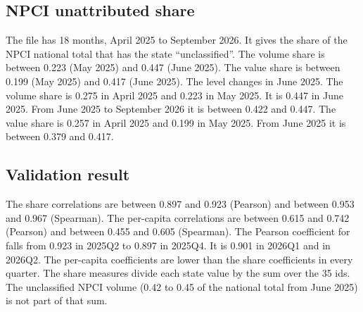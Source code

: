 \documentclass[11pt,a4paper]{article}
\begin{document}
\subsection{NPCI unattributed share}\label{sec:unattr}
The file  has 18 months, April 2025 to September 2026. It gives the share of the NPCI national total that has the state ``unclassified''.
The volume share is between 0.223 (May 2025) and 0.447 (June 2025). The value share is between 0.199 (May 2025) and 0.417 (June 2025).
The level changes in June 2025. The volume share is 0.275 in April 2025 and 0.223 in May 2025. It is 0.447 in June 2025. From June 2025 to September 2026 it is between 0.422 and 0.447. The value share is 0.257 in April 2025 and 0.199 in May 2025. From June 2025 it is between 0.379 and 0.417.

\subsection{Validation result}
The share correlations are between 0.897 and 0.923 (Pearson) and between 0.953 and 0.967 (Spearman). The per-capita correlations are between 0.615 and 0.742 (Pearson) and between 0.455 and 0.605 (Spearman).
The Pearson coefficient for  falls from 0.923 in 2025Q2 to 0.897 in 2025Q4. It is 0.901 in 2026Q1 and in 2026Q2. The per-capita coefficients are lower than the share coefficients in every quarter. The share measures divide each state value by the sum over the 35 ids. The unclassified NPCI volume (0.42 to 0.45 of the national total from June 2025) is not part of that sum.
\end{document}
